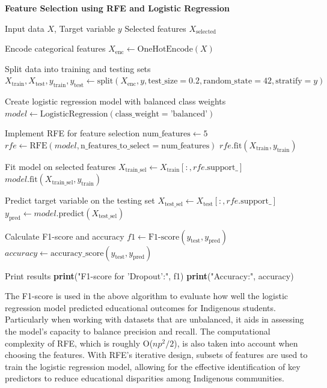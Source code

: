 \documentclass[conference]{IEEEtran}
\begin{document}
\begin{algorithm}
\caption{\textbf{Feature Selection using RFE and Logistic Regression}}
\label{alg:feature-selection}
\begin{algorithmic}[1]
    \REQUIRE Input data $X$, Target variable $y$
    \ENSURE Selected features $X_{\text{selected}}$

    \STATE Encode categorical features
    \STATE $X_{\text{enc}} \gets \text{OneHotEncode}(X)$

    \STATE Split data into training and testing sets
    \STATE $X_{\text{train}}, X_{\text{test}}, y_{\text{train}}, y_{\text{test}} \gets \text{split}(X_{\text{enc}}, y, \text{test\_size} = 0.2, \text{random\_state} = 42, \text{stratify} = y)$

    \STATE Create logistic regression model with balanced class weights
    \STATE $model \gets \text{LogisticRegression}(\text{class\_weight} = \text{'balanced'})$

    \STATE Implement RFE for feature selection
    \STATE $\text{num\_features} \gets 5$
    \STATE $rfe \gets \text{RFE}(model, \text{n\_features\_to\_select} = \text{num\_features})$
    \STATE $rfe.\text{fit}(X_{\text{train}}, y_{\text{train}})$

    \STATE Fit model on selected features
    \STATE $X_{\text{train\_sel}} \gets X_{\text{train}}[:, rfe.\text{support\_}]$
    \STATE $model.\text{fit}(X_{\text{train\_sel}}, y_{\text{train}})$

    \STATE Predict target variable on the testing set
    \STATE $X_{\text{test\_sel}} \gets X_{\text{test}}[:, rfe.\text{support\_}]$
    \STATE $y_{\text{pred}} \gets model.\text{predict}(X_{\text{test\_sel}})$

    \STATE Calculate F1-score and accuracy
    \STATE $f1 \gets \text{F1-score}(y_{\text{test}}, y_{\text{pred}})$
    \STATE $accuracy \gets \text{accuracy\_score}(y_{\text{test}}, y_{\text{pred}})$

    \STATE Print results
    \STATE \textbf{print}("F1-score for 'Dropout':", f1)
    \STATE \textbf{print}("Accuracy:", accuracy)
\end{algorithmic}
\end{algorithm}

The F1-score is used in the above algorithm to evaluate how well the
logistic regression model predicted educational outcomes for Indigenous students. Particularly when working with datasets that are unbalanced, it aids in assessing the model’s capacity to balance precision and recall. The computational complexity of RFE, which is roughly O($np^2/2$), is also taken into account when choosing the features. With RFE’s iterative design, subsets of features are used to train the logistic regression model, allowing for the effective identification of key predictors to reduce educational disparities among Indigenous communities.
\end{document}

